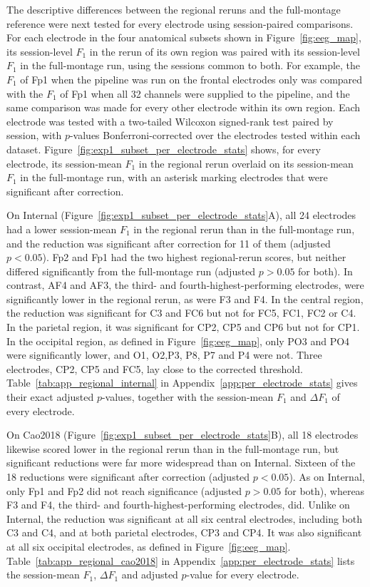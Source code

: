\documentclass[journal,twoside,web]{ieeecolor}
\begin{document}
%
The descriptive differences between the regional reruns and the full-montage reference were next tested for every electrode using session-paired comparisons. For each electrode in the four anatomical subsets shown in Figure~\ref{fig:eeg_map}, its session-level $F_1$ in the rerun of its own region was paired with its session-level $F_1$ in the full-montage run, using the sessions common to both. For example, the $F_1$ of Fp1 when the pipeline was run on the frontal electrodes only was compared with the $F_1$ of Fp1 when all 32 channels were supplied to the pipeline, and the same comparison was made for every other electrode within its own region. Each electrode was tested with a two-tailed Wilcoxon signed-rank test paired by session, with $p$-values Bonferroni-corrected over the electrodes tested within each dataset. Figure~\ref{fig:exp1_subset_per_electrode_stats} shows, for every electrode, its session-mean $F_1$ in the regional rerun overlaid on its session-mean $F_1$ in the full-montage run, with an asterisk marking electrodes that were significant after correction.
 
%
On Internal (Figure~\ref{fig:exp1_subset_per_electrode_stats}A), all 24 electrodes had a lower session-mean $F_1$ in the regional rerun than in the full-montage run, and the reduction was significant after correction for 11 of them (adjusted $p < 0.05$). Fp2 and Fp1 had the two highest regional-rerun scores, but neither differed significantly from the full-montage run (adjusted $p > 0.05$ for both). In contrast, AF4 and AF3, the third- and fourth-highest-performing electrodes, were significantly lower in the regional rerun, as were F3 and F4. In the central region, the reduction was significant for C3 and FC6 but not for FC5, FC1, FC2 or C4. In the parietal region, it was significant for CP2, CP5 and CP6 but not for CP1. In the occipital region, as defined in Figure~\ref{fig:eeg_map}, only PO3 and PO4 were significantly lower, and O1, O2,P3, P8, P7 and P4 were not. Three electrodes, CP2, CP5 and FC5, lay close to the corrected threshold. Table~\ref{tab:app_regional_internal} in Appendix~\ref{app:per_electrode_stats} gives their exact adjusted $p$-values, together with the session-mean $F_1$ and $\Delta F_1$ of every electrode.
 
%
On Cao2018 (Figure~\ref{fig:exp1_subset_per_electrode_stats}B), all 18 electrodes likewise scored lower in the regional rerun than in the full-montage run, but significant reductions were far more widespread than on Internal. Sixteen of the 18 reductions were significant after correction (adjusted $p < 0.05$). As on Internal, only Fp1 and Fp2 did not reach significance (adjusted $p > 0.05$ for both), whereas F3 and F4, the third- and fourth-highest-performing electrodes, did. Unlike on Internal, the reduction was significant at all six central electrodes, including both C3 and C4, and at both parietal electrodes, CP3 and CP4. It was also significant at all six occipital electrodes, as defined in Figure~\ref{fig:eeg_map}. Table~\ref{tab:app_regional_cao2018} in Appendix~\ref{app:per_electrode_stats} lists the session-mean $F_1$, $\Delta F_1$ and adjusted $p$-value for every electrode.
 
\end{document}
